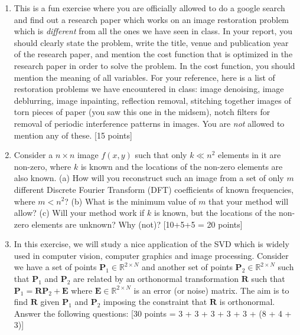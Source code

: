 \documentclass[11pt]{article}
\begin{document}
\begin{enumerate}
\item This is a fun exercise where you are officially allowed to do a google search and find out a research paper which works on an image restoration problem which is \emph{different} from all the ones we have seen in class. In your report, you should clearly state the problem, write the title, venue and publication year of the research paper, and mention the cost function that is optimized in the research paper in order to solve the problem. In the cost function, you should mention the meaning of all variables. For your reference, here is a list of restoration problems we have encountered in class: image denoising, image deblurring, image inpainting, reflection removal, stitching together images of torn pieces of paper (you saw this one in the midsem), notch filters for removal of periodic interference patterns in images. You are \emph{not} allowed to mention any of these. \textsf{[15 points]}

\item Consider a $n \times n$ image $f(x,y)$ such that only $k \ll n^2$ elements in it are non-zero, where $k$ is known and the locations of the non-zero elements are also known. (a) How will you reconstruct such an image from a set of only $m$ different Discrete Fourier Transform (DFT) coefficients of known frequencies, where $m < n^2$? (b) What is the minimum value of $m$ that your method will allow? (c) Will your method work if $k$ is known, but the locations of the non-zero elements are unknown? Why (not)? \textsf{[10+5+5 = 20 points]}

\item In this exercise, we will study a nice application of  the SVD which is widely used in computer vision, computer graphics and image processing. Consider we have a set of points $\boldsymbol{P}_1 \in \mathbb{R}^{2 \times N}$ and another set of points $\boldsymbol{P}_2 \in \mathbb{R}^{2 \times N}$ such that $\boldsymbol{P}_1$ and $\boldsymbol{P}_2$ are related by an orthonormal transformation $\boldsymbol{R}$ such that $\boldsymbol{P}_1 = \boldsymbol{R} \boldsymbol{P}_2 + \boldsymbol{E}$ where $\boldsymbol{E} \in \mathbb{R}^{2 \times N}$ is an error (or noise) matrix. The aim is to find $\boldsymbol{R}$ given $\boldsymbol{P}_1$ and $\boldsymbol{P}_2$ imposing the constraint that $\boldsymbol{R}$ is orthonormal. Answer the following questions: \textsf{[30 points = 3 + 3 + 3 + 3 + 3 + (8 + 4 + 3)]}


\end{enumerate}
\end{document}
